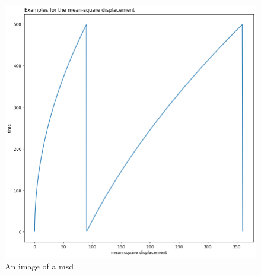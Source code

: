 \documentclass[12pt, a4paper, twoside]{report}
\begin{document}
\begin{figure}[htp]
    \centering
    \includegraphics[width=15cm]{msd.png}
    \caption{An image of a msd}
    \label{fig:msd}
\end{figure}
\end{document}
